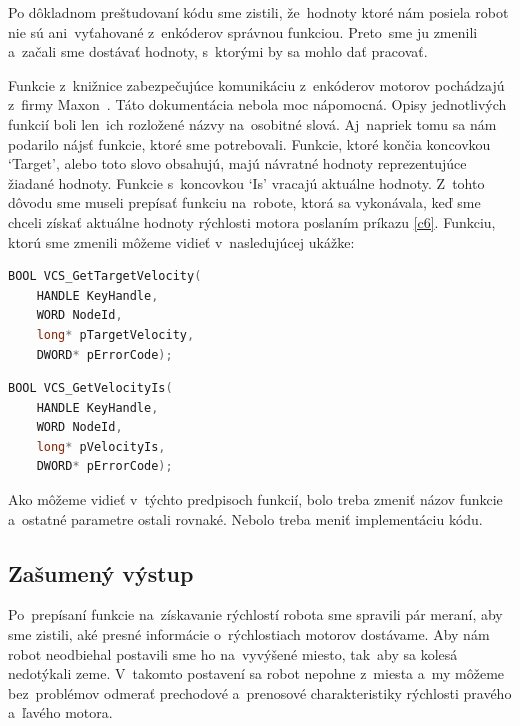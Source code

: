 Po dôkladnom preštudovaní kódu sme zistili, že~hodnoty ktoré nám posiela robot nie sú ani~vyťahované z~enkóderov správnou funkciou. Preto~sme ju
zmenili a~začali sme dostávať hodnoty, s~ktorými by sa mohlo dať pracovať.

Funkcie z~knižnice zabezpečujúce komunikáciu z~enkóderov motorov pochádzajú z~firmy Maxon~\cite{EPOSdoc}. Táto dokumentácia nebola moc nápomocná.
Opisy jednotlivých funkcií boli len~ich rozložené názvy na~osobitné slová. Aj~napriek tomu sa nám podarilo nájsť funkcie, ktoré sme potrebovali.
Funkcie, ktoré končia koncovkou `Target', alebo toto slovo obsahujú, majú návratné hodnoty reprezentujúce žiadané hodnoty. Funkcie s~koncovkou
`Is' vracajú aktuálne hodnoty. Z~tohto dôvodu sme museli prepísať funkciu na~robote, ktorá sa vykonávala, keď sme chceli získať aktuálne hodnoty
rýchlosti motora poslaním príkazu \ref{c6}. Funkciu, ktorú sme zmenili môžeme vidieť v~nasledujúcej ukážke:


\label{VelocityIs}
\begin{lstlisting}[language=C++]
BOOL VCS_GetTargetVelocity(
	HANDLE KeyHandle,
	WORD NodeId,
	long* pTargetVelocity,
	DWORD* pErrorCode);
\end{lstlisting}

\begin{lstlisting}[language=C++]
BOOL VCS_GetVelocityIs(
	HANDLE KeyHandle,
	WORD NodeId,
	long* pVelocityIs,
	DWORD* pErrorCode);
\end{lstlisting}

\noindent Ako môžeme vidieť v~týchto predpisoch funkcií, bolo treba zmeniť názov funkcie a~ostatné parametre ostali rovnaké.
Nebolo treba meniť implementáciu kódu.

\subsection{Zašumený výstup}

Po~prepísaní funkcie na~získavanie rýchlostí robota sme spravili pár meraní, aby sme zistili, aké presné informácie o~rýchlostiach
motorov dostávame. Aby nám robot neodbiehal postavili sme ho na~vyvýšené miesto, tak~aby sa kolesá nedotýkali zeme. V~takomto
postavení sa robot nepohne z~miesta a~my môžeme bez~problémov odmerať prechodové a~prenosové charakteristiky rýchlosti pravého
a~ľavého motora.

